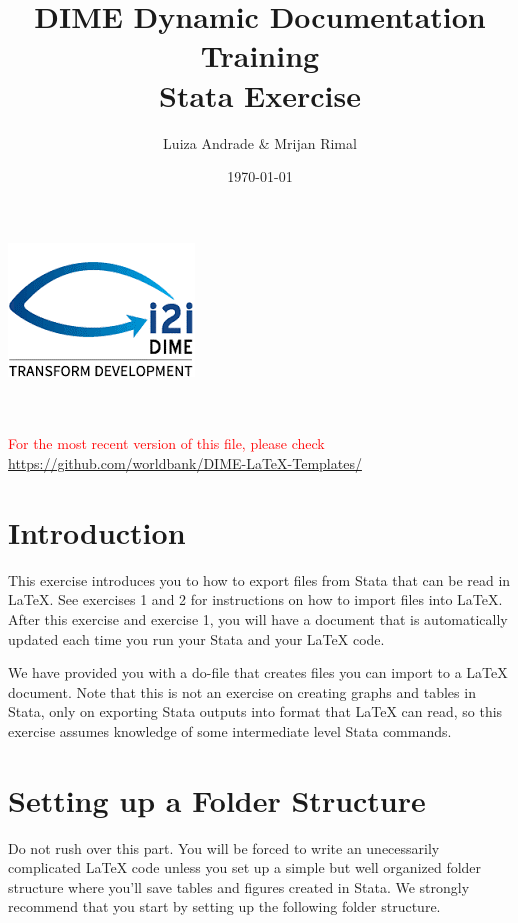 \documentclass[]{article}
\title{DIME Dynamic Documentation Training \\ Stata Exercise}
\author{Luiza Andrade \& Mrijan Rimal}
\date{\today}
\begin{document}
\makeatletter
\begin{titlepage}
	\begin{center}
		\includegraphics[width=0.3\linewidth]{img/i2i.png}\\[10ex]
		{\LARGE \bfseries  \@title }\\[2ex] 
		{\Large  \@author}\\[20ex] 
		{\large \@date}
	\end{center}
	\vspace{5cm}
	\textcolor{red}{For the most recent version of this file, please check \url{https://github.com/worldbank/DIME-LaTeX-Templates/}}
\end{titlepage}
\makeatother

\tableofcontents

\newpage

\section*{Introduction}
This exercise introduces you to how to export files from Stata that can be read in {\LaTeX}. See exercises 1 and 2 for instructions on how to import files into {\LaTeX}. After this exercise and exercise 1, you will have a document that is automatically updated each time you run your Stata and your {\LaTeX} code.

We have provided you with a do-file that creates files you can import to a {\LaTeX} document. Note that this is not an exercise on creating graphs and tables in Stata, only on exporting Stata outputs into format that {\LaTeX} can read, so this exercise assumes knowledge of some intermediate level Stata commands.

\section{Setting up a Folder Structure}
Do not rush over this part. You will be forced to write an unecessarily complicated {\LaTeX} code unless you set up a simple but well organized folder structure where you'll save tables and figures created in Stata. We strongly recommend that you start by setting up the following folder structure. 
\end{document}
